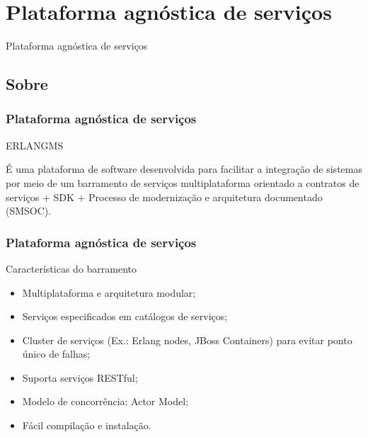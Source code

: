 \documentclass{beamer}
\begin{document}
\section{Plataforma agnóstica de serviços}


\begin{frame}[c]{ }
\centering
  \huge{Plataforma agnóstica de serviços}
\end{frame}



\subsection{Sobre}


\begin{frame}
  \frametitle{Plataforma agnóstica de serviços}

  \begin{exampleblock}{ERLANGMS}
  
É uma plataforma de software desenvolvida para facilitar a integração de sistemas por meio de um barramento 
de serviços multiplataforma orientado a contratos de serviços + SDK + Processo de modernização e arquitetura documentado (SMSOC).

  \end{exampleblock}

  
\end{frame}


\begin{frame}
  \frametitle{Plataforma agnóstica de serviços}

  \begin{exampleblock}{Características do barramento}
  
	  \begin{itemize}
		\item<1->Multiplataforma e arquitetura modular;
	    \item<1->Serviços especificados em catálogos de serviços;
	    \item<1->Cluster de serviços (Ex.: Erlang nodes, JBoss Containers) para evitar ponto único de falhas;
    	    \item<1->Suporta serviços RESTful;
   	    \item<1->Modelo de concorrência: Actor Model;
    	    \item<1->Fácil compilação e instalação.
	  \end{itemize}

  \end{exampleblock}

  
\end{frame}
\end{document}
